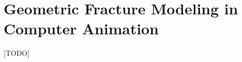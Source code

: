 %

\chapter{Geometric Fracture Modeling in Computer Animation} \label{chap:partI.fractureanimation}

[TODO]
